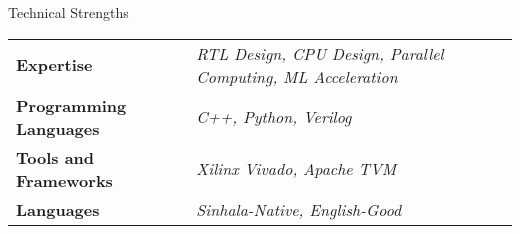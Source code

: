 \documentclass[
	11pt, %
]{./../assets/resume} %
\begin{document}
	




\begin{rSection}{Technical Strengths}

	\def\arraystretch{1.5}

	\begin{tabular}{ l l}
		\textbf{Expertise} & \emph{RTL Design, CPU Design, Parallel Computing, ML Acceleration} \\
		\textbf{Programming Languages} & \emph{C++, Python, Verilog} \\
		\textbf{Tools and Frameworks} & \emph{Xilinx Vivado, Apache TVM} \\ 
		\textbf{Languages} & \emph{Sinhala-Native, English-Good} \\
	\end{tabular}

\end{rSection}

\end{document}
